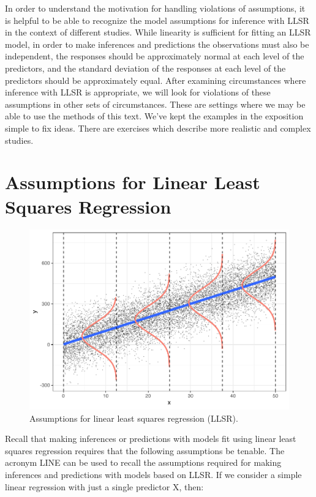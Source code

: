 \documentclass[
]{krantz}
\begin{document}
In order to understand the motivation for handling violations of assumptions, it is helpful to be able to recognize the model assumptions for inference with LLSR in the context of different studies. While linearity is sufficient for fitting an LLSR model, in order to make inferences and predictions the observations must also be independent, the responses should be approximately normal at each level of the predictors, and the standard deviation of the responses at each level of the predictors should be approximately equal. After examining circumstances where inference with LLSR is appropriate, we will look for violations of these assumptions in other sets of circumstances. These are settings where we may be able to use the methods of this text. We've kept the examples in the exposition simple to fix ideas. There are exercises which describe more realistic and complex studies.

\section{Assumptions for Linear Least Squares Regression}\label{assumptions-for-linear-least-squares-regression}

\begin{figure}

{\centering \includegraphics[width=0.9\linewidth]{bookdown-BeyondMLR_files/figure-latex/OLSassumptions-1} 

}

\caption{Assumptions for linear least squares regression (LLSR).}\label{fig:OLSassumptions}
\end{figure}

Recall that making inferences or predictions with models fit using linear least squares regression  requires that the following assumptions be tenable. The acronym LINE can be used to recall the assumptions required for making inferences and predictions with models based on LLSR. If we consider a simple linear regression  with just a single predictor X, then:
\end{document}
